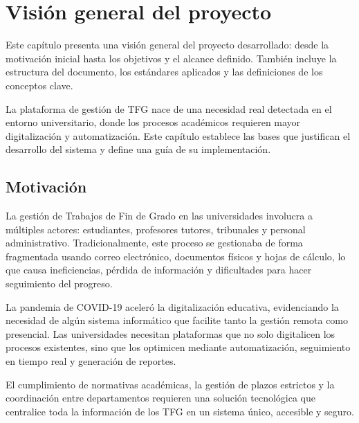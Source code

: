 \documentclass[12pt,a4paper,oneside]{report}
\begin{document}


\renewcommand{\contentsname}{Índice}
\thispagestyle{plain}
\tableofcontents
\clearpage

\renewcommand{\listfigurename}{Lista de Figuras}
\thispagestyle{plain}
\listoffigures
\clearpage

\markboth{}{}

\setcounter{chapter}{0}

\chapter{Visión general del
proyecto}\label{visiuxf3n-general-del-proyecto}
Este capítulo presenta una visión general del proyecto desarrollado: desde la motivación inicial hasta los objetivos y el alcance definido. También incluye la estructura del documento, los estándares aplicados y las definiciones de los conceptos clave.

La plataforma de gestión de TFG nace de una necesidad real detectada en el entorno universitario, donde los procesos académicos requieren mayor digitalización y automatización. Este capítulo establece las bases que justifican el desarrollo del sistema y define una guía de su implementación.

\section{Motivación}\label{motivaciuxf3n}

La gestión de Trabajos de Fin de Grado en las universidades involucra a múltiples actores: estudiantes, profesores tutores, tribunales y personal administrativo. Tradicionalmente, este proceso se gestionaba de forma fragmentada usando correo electrónico, documentos físicos y hojas de cálculo, lo que causa ineficiencias, pérdida de información y dificultades para hacer seguimiento del progreso.

La pandemia de COVID-19 aceleró la digitalización educativa, evidenciando la necesidad de algún sistema informático que facilite tanto la gestión remota como presencial. Las universidades necesitan plataformas que no solo digitalicen los procesos existentes, sino que los optimicen mediante automatización, seguimiento en tiempo real y generación de reportes.

El cumplimiento de normativas académicas, la gestión de plazos estrictos y la coordinación entre departamentos requieren una solución tecnológica que centralice toda la información de los TFG en un sistema único, accesible y seguro.
\end{document}
